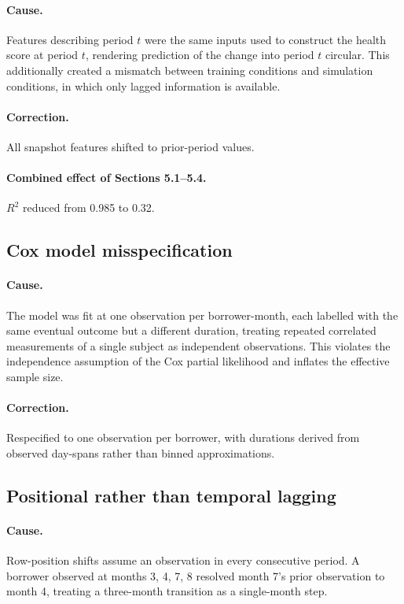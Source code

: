 \documentclass[11pt,a4paper]{article}
\begin{document}
\paragraph{Cause.} Features describing period $t$ were the same inputs used to construct
the health score at period $t$, rendering prediction of the change into period $t$
circular. This additionally created a mismatch between training conditions and simulation
conditions, in which only lagged information is available.

\paragraph{Correction.} All snapshot features shifted to prior-period values.

\paragraph{Combined effect of Sections 5.1--5.4.} $R^2$ reduced from 0.985 to 0.32.

\subsection{Cox model misspecification}

\paragraph{Cause.} The model was fit at one observation per borrower-month, each labelled
with the same eventual outcome but a different duration, treating repeated correlated
measurements of a single subject as independent observations. This violates the
independence assumption of the Cox partial likelihood and inflates the effective sample
size.

\paragraph{Correction.} Respecified to one observation per borrower, with durations
derived from observed day-spans rather than binned approximations.

\subsection{Positional rather than temporal lagging}
\label{sec:lagging}

\paragraph{Cause.} Row-position shifts assume an observation in every consecutive period.
A borrower observed at months 3, 4, 7, 8 resolved month 7's prior observation to month 4,
treating a three-month transition as a single-month step.
\end{document}
